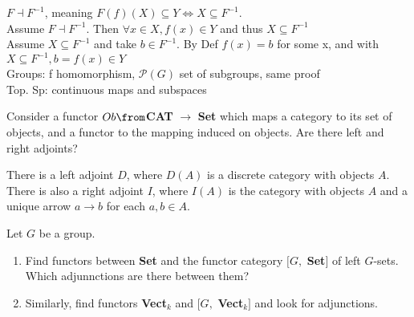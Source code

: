 \begin{answer}
$F \dashv F^{-1}$, meaning $F(f)(X) \subseteq Y \Leftrightarrow X \subseteq F^{-1}$.\\
Assume $F \dashv F^{-1}$. Then $\forall x \in X, f(x) \in Y$ and thus $X \subseteq F^{-1}$\\
Assume $X \subseteq F^{-1}$ and take $b \in F^{-1}$. By Def $f(x) = b$ for some x, and with $X \subseteq F^{-1}, b = f(x) \in Y$\\
Groups: f homomorphism, $\mathcal{P}(G)$ set of subgroups, same proof \\
Top. Sp: continuous maps and subspaces

\end{answer}

\begin{exercise}
Consider a functor $Ob \from $\textbf {CAT }$  \to $\textbf { Set} which maps a category to its set of objects, and a functor to the mapping induced on objects. Are there left and right adjoints?
\end{exercise}

\begin{answer}
There is a left adjoint $D$, where $D(A)$ is a discrete category with objects $A$. There is also a right adjoint $I$, where $I(A)$ is the category with objects $A$ and a unique arrow $a \to b$ for each $a,b \in A$.
\end{answer}

\begin{exercise}
Let $G$ be a group. \begin{enumerate}
\item Find functors between \textbf{Set} and the functor category $[G,$ \textbf{Set}$]$ of left $G$-sets. Which adjunnctions are there between them?
\item Similarly, find functors \textbf{Vect}$_k$ and $[G,$ \textbf{Vect}$_k]$ and look for adjunctions.
\end{enumerate}
\end{exercise}

